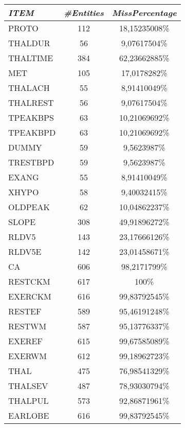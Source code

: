 \documentclass[a4paper,12pt]{article}
\begin{document}
\begin{multicols}{2}
\begin{tabular}{|l|c|c|}
            \end{tabular}
            \begin{tabular}{|l|c|c|} \hline    
                
                \textit{ITEM} & \textit{\#Entities}	& \textit{MissPercentage} \\
                \hline PROTO	&112&	18,15235008\% \\
                \hline THALDUR&	56&	9,07617504\% \\
                \hline THALTIME&	384&	62,23662885\% \\
                \hline MET	&105	&17,0178282\% \\
                \hline THALACH&	55	&8,91410049\% \\
                \hline THALREST&	56	&9,07617504\% \\
                \hline TPEAKBPS	&63&	10,21069692\% \\
                \hline TPEAKBPD	&63&	10,21069692\% \\
                \hline DUMMY	&59&	9,5623987\% \\
                \hline TRESTBPD&	59&	9,5623987\% \\
                \hline EXANG	&55&	8,91410049\% \\
                \hline XHYPO	&58&	9,40032415\% \\
                \hline OLDPEAK&	62&	10,04862237\% \\
                \hline SLOPE	&308	&49,91896272\% \\
                \hline RLDV5	&143	&23,17666126\% \\
                \hline RLDV5E&	142	&23,01458671\% \\
                \hline CA	&606&	98,2171799\% \\
                \hline RESTCKM	&617&	100\% \\
                \hline EXERCKM	&616&	99,83792545\% \\
                \hline RESTEF	&589&	95,46191248\% \\
                \hline RESTWM	&587&	95,13776337\% \\
                \hline EXEREF	&615&	99,67585089\% \\
                \hline EXERWM	&612&	99,18962723\% \\
                \hline THAL&	475&	76,98541329\% \\
                \hline THALSEV&	487	&78,93030794\% \\
                \hline THALPUL&	573	&92,86871961\% \\
                \hline EARLOBE&	616&	99,83792545\% \\ \hline
            
            \end{tabular}
            
        \end{multicols}
\end{document}
